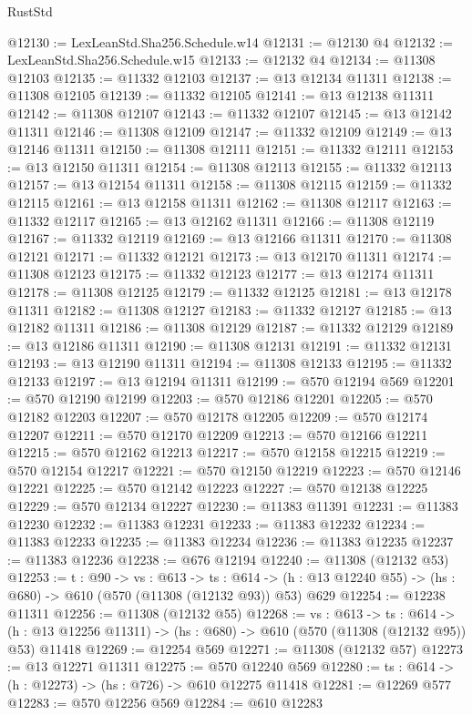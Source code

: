 \begin{lexlean}{RustStd}
\begin{coremodule}
@12130 := LexLeanStd.Sha256.Schedule.w14
@12131 := @12130 @4
@12132 := LexLeanStd.Sha256.Schedule.w15
@12133 := @12132 @4
@12134 := @11308 @12103
@12135 := @11332 @12103
@12137 := @13 @12134 @11311
@12138 := @11308 @12105
@12139 := @11332 @12105
@12141 := @13 @12138 @11311
@12142 := @11308 @12107
@12143 := @11332 @12107
@12145 := @13 @12142 @11311
@12146 := @11308 @12109
@12147 := @11332 @12109
@12149 := @13 @12146 @11311
@12150 := @11308 @12111
@12151 := @11332 @12111
@12153 := @13 @12150 @11311
@12154 := @11308 @12113
@12155 := @11332 @12113
@12157 := @13 @12154 @11311
@12158 := @11308 @12115
@12159 := @11332 @12115
@12161 := @13 @12158 @11311
@12162 := @11308 @12117
@12163 := @11332 @12117
@12165 := @13 @12162 @11311
@12166 := @11308 @12119
@12167 := @11332 @12119
@12169 := @13 @12166 @11311
@12170 := @11308 @12121
@12171 := @11332 @12121
@12173 := @13 @12170 @11311
@12174 := @11308 @12123
@12175 := @11332 @12123
@12177 := @13 @12174 @11311
@12178 := @11308 @12125
@12179 := @11332 @12125
@12181 := @13 @12178 @11311
@12182 := @11308 @12127
@12183 := @11332 @12127
@12185 := @13 @12182 @11311
@12186 := @11308 @12129
@12187 := @11332 @12129
@12189 := @13 @12186 @11311
@12190 := @11308 @12131
@12191 := @11332 @12131
@12193 := @13 @12190 @11311
@12194 := @11308 @12133
@12195 := @11332 @12133
@12197 := @13 @12194 @11311
@12199 := @570 @12194 @569
@12201 := @570 @12190 @12199
@12203 := @570 @12186 @12201
@12205 := @570 @12182 @12203
@12207 := @570 @12178 @12205
@12209 := @570 @12174 @12207
@12211 := @570 @12170 @12209
@12213 := @570 @12166 @12211
@12215 := @570 @12162 @12213
@12217 := @570 @12158 @12215
@12219 := @570 @12154 @12217
@12221 := @570 @12150 @12219
@12223 := @570 @12146 @12221
@12225 := @570 @12142 @12223
@12227 := @570 @12138 @12225
@12229 := @570 @12134 @12227
@12230 := @11383 @11391
@12231 := @11383 @12230
@12232 := @11383 @12231
@12233 := @11383 @12232
@12234 := @11383 @12233
@12235 := @11383 @12234
@12236 := @11383 @12235
@12237 := @11383 @12236
@12238 := @676 @12194
@12240 := @11308 (@12132 @53)
@12253 := {t : @90} ->
  {vs : @613} ->
  {ts : @614} -> (h : @13 @12240 @55) -> (hs : @680) -> @610 (@570 (@11308 (@12132 @93)) @53) @629
@12254 := @12238 @11311
@12256 := @11308 (@12132 @55)
@12268 := {vs : @613} ->
  {ts : @614} ->
  (h : @13 @12256 @11311) -> (hs : @680) -> @610 (@570 (@11308 (@12132 @95)) @53) @11418
@12269 := @12254 @569
@12271 := @11308 (@12132 @57)
@12273 := @13 @12271 @11311
@12275 := @570 @12240 @569
@12280 := {ts : @614} -> (h : @12273) -> (hs : @726) -> @610 @12275 @11418
@12281 := @12269 @577
@12283 := @570 @12256 @569
@12284 := @610 @12283

\end{coremodule}
\end{lexlean}
